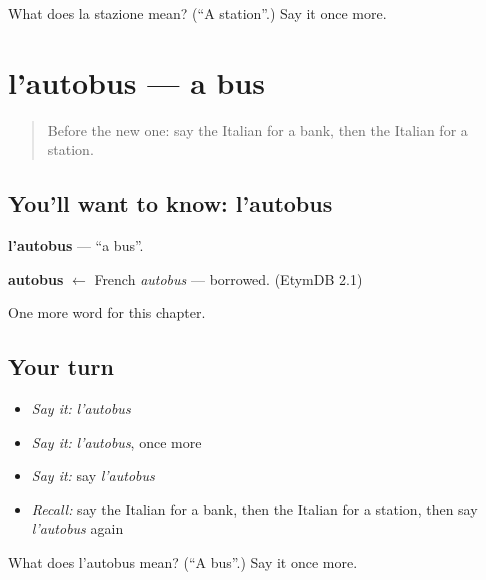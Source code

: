 \begin{tcolorbox}[breakable,colback=teal!4,colframe=teal!35!black,title={Before you move on}]
What does la stazione mean? (\textquotedblleft{}A station\textquotedblright{}.) Say it once more.
\end{tcolorbox}
\section[l'autobus]{l'autobus — a bus}

\label{lesson:IT-C82-autobus}



\begin{quote}
Before the new one: say the Italian for a bank, then the Italian for a station.
\end{quote}

\subsection*{You'll want to know: l'autobus}
\textbf{l'autobus} — \textquotedblleft{}a bus\textquotedblright{}.

\begin{cousinweb}
\textbf{autobus} $\leftarrow$ French \emph{autobus} — borrowed. (EtymDB 2.1)
\end{cousinweb}

\begin{grammarlens}[title={What you've built}]
One more word for this chapter.
\end{grammarlens}

\subsection*{Your turn}
\begin{itemize}
\raggedright
  \item \emph{Say it:} \emph{l'autobus}
  \item \emph{Say it:} \emph{l'autobus}, once more
  \item \emph{Say it:} say \emph{l'autobus}
  \item \emph{Recall:} say the Italian for a bank, then the Italian for a station, then say \emph{l'autobus} again
\end{itemize}

\begin{tcolorbox}[breakable,colback=teal!4,colframe=teal!35!black,title={Before you move on}]
What does l'autobus mean? (\textquotedblleft{}A bus\textquotedblright{}.) Say it once more.
\end{tcolorbox}
